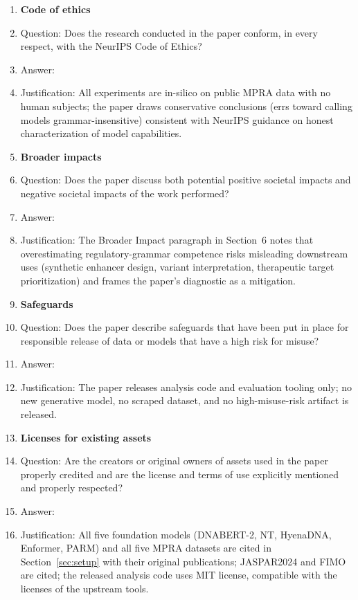 \begin{enumerate}
\item {\bf Code of ethics}
    \item[] Question: Does the research conducted in the paper conform, in every respect, with the NeurIPS Code of Ethics?
    \item[] Answer: \answerYes{}
    \item[] Justification: All experiments are in-silico on public MPRA data with no human subjects; the paper draws conservative conclusions (errs toward calling models grammar-insensitive) consistent with NeurIPS guidance on honest characterization of model capabilities.

\item {\bf Broader impacts}
    \item[] Question: Does the paper discuss both potential positive societal impacts and negative societal impacts of the work performed?
    \item[] Answer: \answerYes{}
    \item[] Justification: The Broader Impact paragraph in Section~6 notes that overestimating regulatory-grammar competence risks misleading downstream uses (synthetic enhancer design, variant interpretation, therapeutic target prioritization) and frames the paper's diagnostic as a mitigation.

\item {\bf Safeguards}
    \item[] Question: Does the paper describe safeguards that have been put in place for responsible release of data or models that have a high risk for misuse?
    \item[] Answer: \answerNA{}
    \item[] Justification: The paper releases analysis code and evaluation tooling only; no new generative model, no scraped dataset, and no high-misuse-risk artifact is released.

\item {\bf Licenses for existing assets}
    \item[] Question: Are the creators or original owners of assets used in the paper properly credited and are the license and terms of use explicitly mentioned and properly respected?
    \item[] Answer: \answerYes{}
    \item[] Justification: All five foundation models (DNABERT-2, NT, HyenaDNA, Enformer, PARM) and all five MPRA datasets are cited in Section~\ref{sec:setup} with their original publications; JASPAR2024 and FIMO are cited; the released analysis code uses MIT license, compatible with the licenses of the upstream tools.


\end{enumerate}
